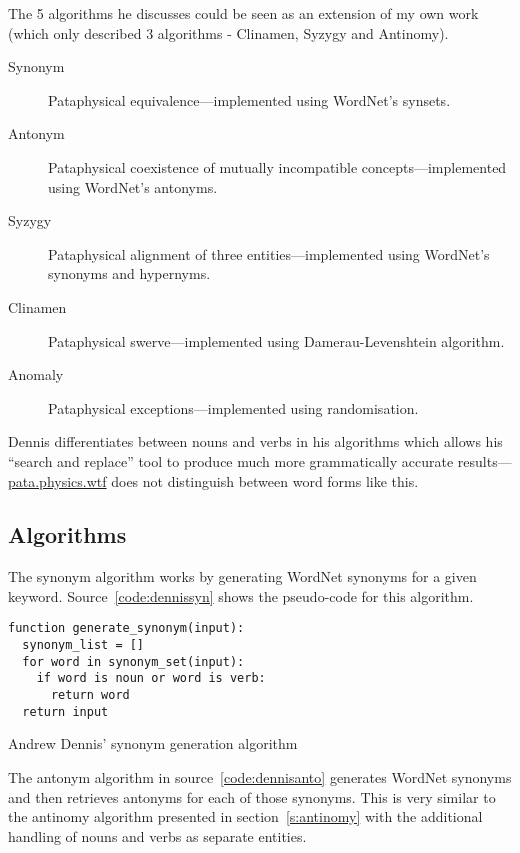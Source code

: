 The 5 algorithms he discusses could be seen as an extension of my own work (which only described 3 algorithms - Clinamen, Syzygy and Antinomy). 

\begin{description}
  \item[Synonym] Pataphysical equivalence---implemented using WordNet's synsets.
  \item[Antonym] Pataphysical coexistence of mutually incompatible concepts---implemented using WordNet's antonyms.
  \item[Syzygy] Pataphysical alignment of three entities---implemented using WordNet's synonyms and hypernyms.
  \item[Clinamen] Pataphysical swerve---implemented using Damerau-Levenshtein algorithm.
  \item[Anomaly] Pataphysical exceptions---implemented using randomisation.
\end{description}

Dennis differentiates between nouns and verbs in his algorithms which allows his ``search and replace'' tool to produce much more grammatically accurate results---\url{pata.physics.wtf} does not distinguish between word forms like this.


\subsection{Algorithms}

The synonym algorithm works by generating WordNet synonyms for a given keyword. Source~\ref{code:dennissyn} shows the pseudo-code for this algorithm.

\begin{listing}[!htbp] %
  \begin{verbatim}
function generate_synonym(input):
  synonym_list = []
  for word in synonym_set(input):
    if word is noun or word is verb:
      return word
  return input
  \end{verbatim}
\caption[Dennis' synonym generation]{Andrew Dennis' synonym generation algorithm}
\label{code:dennissyn}
\end{listing}

The antonym algorithm in source~\ref{code:dennisanto} generates WordNet synonyms and then retrieves antonyms for each of those synonyms. This is very similar to the antinomy algorithm presented in section~\ref{s:antinomy} with the additional handling of nouns and verbs as separate entities.


